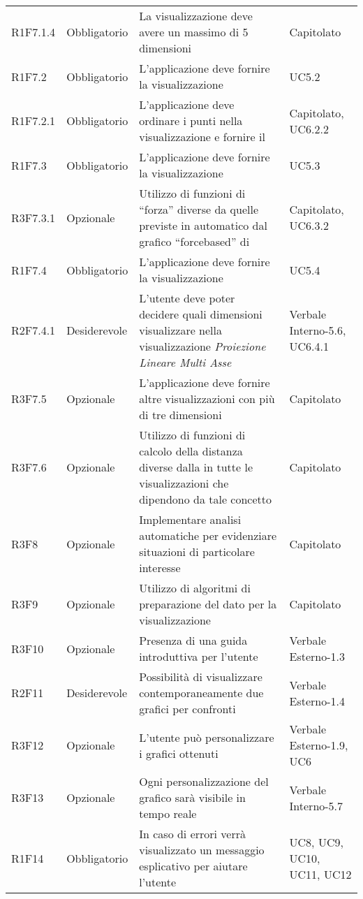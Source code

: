 \begin{center}
\begin{longtable}{C{2cm} | C{3cm} | C{7cm} | C{3.3cm}}
R1F7.1.4 & Obbligatorio & La visualizzazione  deve avere un massimo di 5 dimensioni & Capitolato\\

R1F7.2 & Obbligatorio & L'applicazione deve fornire la visualizzazione  & UC5.2\\
R1F7.2.1 & Obbligatorio & L'applicazione deve ordinare i punti nella visualizzazione  e fornire il  & Capitolato, UC6.2.2 \\
R1F7.3 & Obbligatorio & L'applicazione deve fornire la visualizzazione  & UC5.3\\
R3F7.3.1 & Opzionale & Utilizzo di funzioni di “forza” diverse da quelle previste in automatico dal grafico “forcebased” di  & Capitolato, UC6.3.2\\
R1F7.4 & Obbligatorio & L'applicazione deve fornire la visualizzazione  & UC5.4 \\
R2F7.4.1 & Desiderevole & L'utente deve poter decidere quali dimensioni visualizzare nella visualizzazione \textit{Proiezione Lineare Multi Asse} & Verbale Interno-5.6, UC6.4.1\\
R3F7.5 & Opzionale & L'applicazione deve fornire altre visualizzazioni con più di tre dimensioni & Capitolato\\
R3F7.6 & Opzionale & Utilizzo di funzioni di calcolo della distanza diverse dalla  in tutte le visualizzazioni che dipendono da tale concetto & Capitolato \\
R3F8 & Opzionale & Implementare analisi automatiche per evidenziare situazioni di particolare interesse & Capitolato\\
R3F9 & Opzionale & Utilizzo di algoritmi di preparazione del dato per la visualizzazione & Capitolato\\
R3F10 & Opzionale & Presenza di una guida introduttiva per l'utente & Verbale Esterno-1.3\\
R2F11 & Desiderevole & Possibilità di visualizzare contemporaneamente due grafici per confronti & Verbale Esterno-1.4\\
R3F12 & Opzionale & L'utente può personalizzare i grafici ottenuti & Verbale Esterno-1.9, UC6 \\
R3F13 & Opzionale & Ogni personalizzazione del grafico sarà visibile in tempo reale & Verbale Interno-5.7 \\
R1F14 & Obbligatorio & In caso di errori verrà visualizzato un messaggio esplicativo per aiutare l'utente & UC8, UC9, UC10, UC11, UC12\\

\end{longtable}
\end{center}
